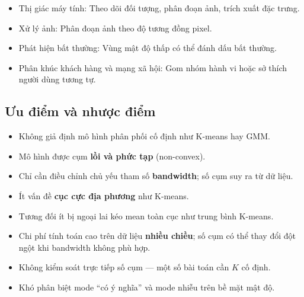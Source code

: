 \begin{ynghia}[title={Ứng dụng Mean-Shift}]
  \begin{itemize}
    \item Thị giác máy tính: Theo dõi đối tượng, phân đoạn ảnh, trích xuất đặc trưng.
    \item Xử lý ảnh: Phân đoạn ảnh theo độ tương đồng pixel.
    \item Phát hiện bất thường: Vùng mật độ thấp có thể đánh dấu bất thường.
    \item Phân khúc khách hàng và mạng xã hội: Gom nhóm hành vi hoặc sở thích người dùng tương tự.
  \end{itemize}
\end{ynghia}

\subsection{Ưu điểm và nhược điểm}

\begin{tinhchat}[title={Ưu điểm}]
\begin{itemize}
  \item Không giả định mô hình phân phối cố định như K-means hay GMM.
  \item Mô hình được cụm \textbf{lồi và phức tạp} (non-convex).
  \item Chỉ cần điều chỉnh chủ yếu tham số \textbf{bandwidth}; số cụm suy ra từ dữ liệu.
  \item Ít vấn đề \textbf{cục cực địa phương} như K-means.
  \item Tương đối ít bị ngoại lai kéo mean toàn cục như trung bình K-means.
\end{itemize}
\end{tinhchat}

\begin{luuy}[title={Nhược điểm}]
\begin{itemize}
  \item Chi phí tính toán cao trên dữ liệu \textbf{nhiều chiều}; số cụm có thể thay đổi đột ngột khi bandwidth không phù hợp.
  \item Không kiểm soát trực tiếp số cụm --- một số bài toán cần $K$ cố định.
  \item Khó phân biệt mode ``có ý nghĩa'' và mode nhiễu trên bề mặt mật độ.
\end{itemize}
\end{luuy}

